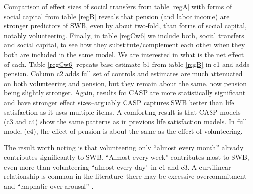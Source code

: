 \documentclass[10pt, letterpaper]{article}
\begin{document}
\begin{spacing}{1.4}
Comparison of effect sizes of social transfers from table \ref{regA} with forms
of   
 social capital from table \ref{regB} reveals that pension (and labor income) are
 stronger  predictors of SWB, even by about two-fold,  than forms of  social capital, notably volunteering.
%
Finally, in table \ref{regCw6} we include both, social transfers and social
capital,  to see how they substitute/complement each other
when they both are included in the same model. We are interested in what is the net
effect of each.
%
Table \ref{regCw6} repeats base estimate b1 from table \ref{regB} in c1 and
adds pension. %
% 
Column c2 adds full set of controls and estimates are much attenuated
on both volunteering and pension, but they remain about the same, now pension
being slightly stronger.
%
Again, results for CASP are more statistically
significant and have stronger effect sizes--arguably CASP captures SWB better
than life satisfaction as it uses multiple items. A comforting result is
that CASP models (c3 and c4) show the same patterns as in previous life satisfaction
models. In full model (c4), the effect of pension is about the same as the effect of volunteering.


The result worth noting is that volunteering only ``almost every month'' already
contributes significantly to SWB. ``Almost every week'' contributes most
to SWB, even more than volunteering ``almost every day'' in c1 and c3. A curvilinear
relationship is common in the literature--there may be excessive overcommitment
and ``emphatic over-arousal''  \citep{wilson12B}.%



\end{spacing}
\end{document}
